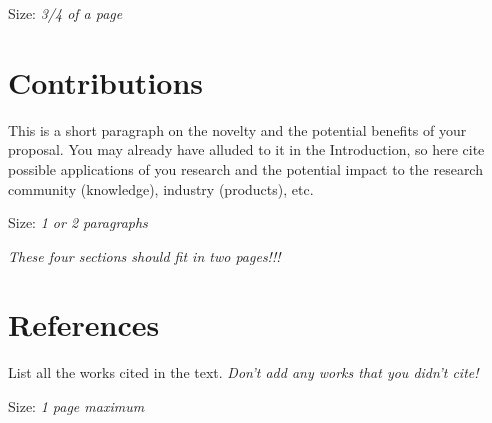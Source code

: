 \documentclass[12pt]{article}
\def\withbiblatex{} %
\begin{document}
Size: \emph{3/4 of a page}

\section*{Contributions}

This is a short paragraph on the novelty and the potential benefits of your proposal. You may already have alluded to it in the Introduction, so here cite possible applications of you research and the potential impact to the research community (knowledge), industry (products), etc.

Size: \emph{1 or 2 paragraphs}

\emph{These four sections should fit in two pages!!!}
 
\section*{References}

List all the works cited in the text. \emph{Don't add any works that you didn't cite!}

Size: \emph{1 page maximum}

\clearpage

\ifdefined\withbiblatex 
\printbibliography
\else


\fi
\end{document}

